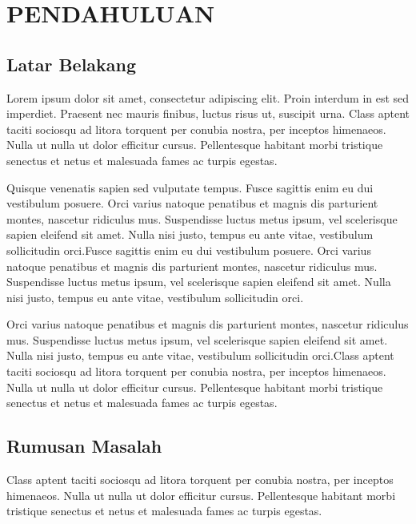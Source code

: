 \chapter{PENDAHULUAN}

\section{Latar Belakang}
Lorem ipsum dolor sit amet, consectetur adipiscing elit. Proin interdum in est sed imperdiet. Praesent nec mauris finibus, luctus risus ut, suscipit urna. Class aptent taciti sociosqu ad litora torquent per conubia nostra, per inceptos himenaeos. Nulla ut nulla ut dolor efficitur cursus. Pellentesque habitant morbi tristique senectus et netus et malesuada fames ac turpis egestas.

Quisque venenatis sapien sed vulputate tempus. Fusce sagittis enim eu dui vestibulum posuere. Orci varius natoque penatibus et magnis dis parturient montes, nascetur ridiculus mus. Suspendisse luctus metus ipsum, vel scelerisque sapien eleifend sit amet. Nulla nisi justo, tempus eu ante vitae, vestibulum sollicitudin orci.Fusce sagittis enim eu dui vestibulum posuere. Orci varius natoque penatibus et magnis dis parturient montes, nascetur ridiculus mus. Suspendisse luctus metus ipsum, vel scelerisque sapien eleifend sit amet. Nulla nisi justo, tempus eu ante vitae, vestibulum sollicitudin orci.

Orci varius natoque penatibus et magnis dis parturient montes, nascetur ridiculus mus. Suspendisse luctus metus ipsum, vel scelerisque sapien eleifend sit amet. Nulla nisi justo, tempus eu ante vitae, vestibulum sollicitudin orci.Class aptent taciti sociosqu ad litora torquent per conubia nostra, per inceptos himenaeos. Nulla ut nulla ut dolor efficitur cursus. Pellentesque habitant morbi tristique senectus et netus et malesuada fames ac turpis egestas.

\section{Rumusan Masalah}
Class aptent taciti sociosqu ad litora torquent per conubia nostra, per inceptos himenaeos. Nulla ut nulla ut dolor efficitur cursus. Pellentesque habitant morbi tristique senectus et netus et malesuada fames ac turpis egestas.

